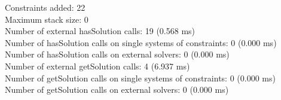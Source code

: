 \documentclass{article}
\begin{document}
Constraints added: 22\\Maximum stack size: 0\\Number of external hasSolution calls: 19 (0.568 ms)\\Number of hasSolution calls on single systems of constraints: 0 (0.000 ms)\\Number of hasSolution calls on external solvers: 0 (0.000 ms)\\Number of external getSolution calls: 4 (6.937 ms)\\Number of getSolution calls on single systems of constraints: 0 (0.000 ms)\\Number of getSolution calls on external solvers: 0 (0.000 ms)\\
\end{document}
